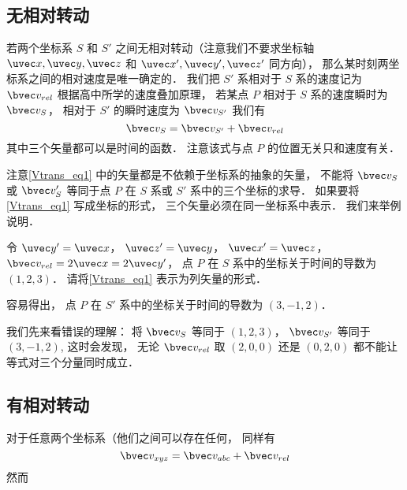 


\subsection{无相对转动}
若两个坐标系 $S$ 和 $S'$ 之间无相对转动（注意我们不要求坐标轴 $\uvec x, \uvec y, \uvec z$ 和 $\uvec x', \uvec y', \uvec z'$ 同方向）， 那么某时刻两坐标系之间的相对速度是唯一确定的． 我们把 $S'$ 系相对于 $S$ 系的速度记为 $\bvec v_{rel}$ 根据高中所学的速度叠加原理， 若某点 $P$ 相对于 $S$ 系的速度瞬时为 $\bvec v_S$， 相对于 $S'$ 的瞬时速度为 $\bvec v_{S'}$ 我们有
\begin{equation}\label{Vtrans_eq1}
\bvec v_{S} = \bvec v_{S'} + \bvec v_{rel}
\end{equation}
其中三个矢量都可以是时间的函数． 注意该式与点 $P$ 的位置无关只和速度有关．

注意\autoref{Vtrans_eq1} 中的矢量都是不依赖于坐标系的抽象的矢量， 不能将 $\bvec v_S$ 或 $\bvec v_S'$ 等同于点 $P$ 在 $S$ 系或 $S'$ 系中的三个坐标的求导． 如果要将\autoref{Vtrans_eq1} 写成坐标的形式， 三个矢量必须在同一坐标系中表示． 我们来举例说明．

\begin{example}{}
令 $\uvec y' = \uvec x$， $\uvec z' = \uvec y$， $\uvec x' = \uvec z$， $\bvec v_{rel} = 2\uvec x = 2\uvec y'$， 点 $P$ 在 $S$ 系中的坐标关于时间的导数为 $(1, 2, 3)$． 请将\autoref{Vtrans_eq1} 表示为列矢量的形式．

容易得出， 点 $P$ 在 $S'$ 系中的坐标关于时间的导数为 $(3, -1, 2)$．

我们先来看错误的理解： 将 $\bvec v_S$ 等同于 $(1, 2, 3)$， $\bvec v_{S'}$ 等同于 $(3, -1, 2)$,  这时会发现， 无论 $\bvec v_{rel}$ 取 $(2, 0, 0)$ 还是 $(0, 2, 0)$ 都不能让等式对三个分量同时成立．
\end{example}

\subsection{有相对转动}
对于任意两个坐标系（他们之间可以存在任何， 同样有
\begin{equation}
\bvec v_{xyz} = \bvec v_{abc} + \bvec v_{rel}
\end{equation}
然而

